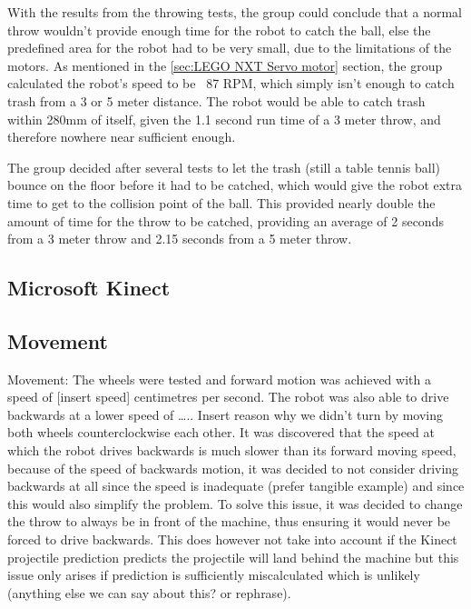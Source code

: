 With the results from the throwing tests, the group could conclude that a normal throw wouldn't provide enough time for the robot to catch the ball, else the predefined area for the robot had to be very small, due to the limitations of the motors. As mentioned in the \ref{sec:LEGO NXT Servo motor} section, the group calculated the robot's speed to be ~87 RPM, which simply isn't enough to catch trash from a 3 or 5 meter distance. The robot would be able to catch trash within 280mm of itself, given the 1.1 second run time of a 3 meter throw, and therefore nowhere near sufficient enough. 

The group decided after several tests to let the trash (still a table tennis ball) bounce on the floor before it had to be catched, which would give the robot extra time to get to the collision point of the ball. This provided nearly double the amount of time for the throw to be catched, providing an average of 2 seconds from a 3 meter throw and 2.15 seconds from a 5 meter throw.

\subsection{Microsoft Kinect}
\label{sec:i1Microsoft KinectImplementation}

\subsection{Movement}
\label{sec:i1MovementImplementation}
Movement: The wheels were tested and forward motion was achieved with a speed of [insert speed] centimetres per second. The robot was also able to drive backwards at a lower speed of ….. Insert reason why we didn't turn by moving both wheels counterclockwise each other. It was discovered that the speed at which the robot drives backwards is much slower than its forward moving speed, because of the speed of backwards motion, it was decided to not consider driving backwards at all since the speed is inadequate (prefer tangible example) and since this would also simplify the problem. To solve this issue, it was decided to change the throw to always be in front of the machine, thus ensuring it would never be forced to drive backwards. This does however not take into account if the Kinect projectile prediction predicts the projectile will land behind the machine but this issue only arises if prediction is sufficiently miscalculated which is unlikely (anything else we can say about this? or rephrase).

